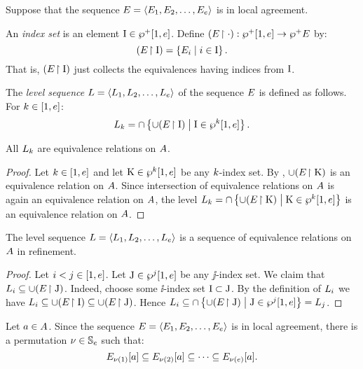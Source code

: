 Suppose that the sequence
$E = \left\langle E_{1}, E_{2}, \dots, E_{e} \right\rangle$ is in local agreement.
\begin{definition}\label{def:lvl-seq}
An \emph{index set} is an element $\mathrm{I} \in \wp^{+}{[}1, e]$.
Define $(E\!\restriction\cdot) : \wp^{+}{[}1, e] \to \wp^{+}{E}$ by:
\[
  (E\!\restriction\mathrm{I}) = \left\{E_{i}\mathrel{}\middle|\mathrel{}i \in \mathrm{I}\right\}.
\]
That is, $(E\!\restriction\mathrm{I})$ just collects the equivalences having indices from
$\mathrm{I}$.

The \emph{level sequence} $L = \left\langle L_{1},L_{2},\dots,L_{e} \right\rangle$ of
the sequence $E$ is defined as follows.
For $k \in [1, e]$:
\[
  L_{k} = \cap \left\{\cup (E\!\restriction\mathrm{I})\mathrel{}\middle|\mathrel{}\mathrm{I} \in \wp^{k}{[}1, e]\right\}.
\]
\end{definition}
\begin{remark}
All $L_{k}$ are equivalence relations on $A$.
\end{remark}
\begin{proof}
Let $k \in [1,e]$ and let $\mathrm{K} \in \wp^{k}{[}1,e]$ be any $k$-index
set.
By , $\cup (E\!\restriction\mathrm{K})$ is an equivalence relation on
$A$.
Since intersection of equivalence relations on $A$ is again an equivalence 
relation on $A$, the level
$L_{k} = \cap \left\{\cup (E\!\restriction\mathrm{K})\mathrel{}\middle|\mathrel{}\mathrm{K} \in \wp^{k}{[}1,e]\right\}$
is an equivalence relation on $A$.
\end{proof}
\begin{lemma}\label{lem:local-lvl-refine}
The level sequence $L = \left\langle L_{1},L_{2},\dots,L_{e} \right\rangle$ is a
sequence of equivalence relations on $A$ in refinement.
\end{lemma}
\begin{proof}
Let $i < j \in [1, e]$.
Let $\mathrm{J} \in \wp^{j}{[}1, e]$ be any $\jj$-index set.
We claim that $L_{i} \subseteq \cup (E\!\restriction\mathrm{J})$.
Indeed, choose some $\ii$-index set $\mathrm{I} \subset \mathrm{J}$.
By the definition of $L_{i}$ we have
$L_{i} \subseteq \cup (E\!\restriction\mathrm{I}) \subseteq \cup (E\!\restriction\mathrm{J})$.
Hence
$L_{i} \subseteq \cap \left\{\cup (E\!\restriction\mathrm{J})\mathrel{}\middle|\mathrel{}\mathrm{J} \in
\wp^{j}{[}1,e]\right\} = L_{j}$.
\end{proof}
Let $a \in A$.
Since the sequence $E = \left\langle E_{1},E_{2},\dots,E_{e} \right\rangle$ is in local
agreement, there is a permutation $\nu \in \mathbb{S}_{e}$ such that:
\begin{equation}\label{eq:local-perm}
  \relEE{\permnu(1)}[\ea] \subseteq
  \relEE{\permnu(2)}[\ea] \subseteq
  \dots \subseteq
  \relEE{\permnu(\sze)}[\ea].
\end{equation}
